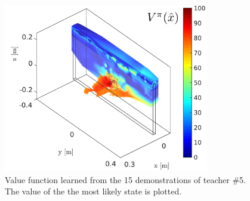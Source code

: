 \begin{figure}
 \centering
 \includegraphics[width=0.8\textwidth]{./ch4-PiH/Figures/Fig/value_subj_5.pdf}
 \caption{Value function learned from the 15 demonstrations of teacher \#5. The value of the the most likely state is plotted.}
 \label{fig:value_function_subj_5}
\end{figure}
 
